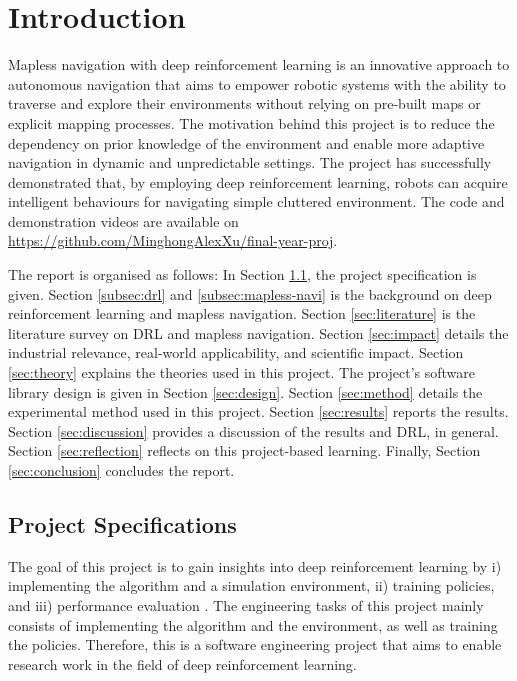 \newpage
\section{Introduction}

Mapless navigation with deep reinforcement learning is an innovative approach to autonomous navigation that aims to empower robotic systems with the ability to traverse and explore their environments without relying on pre-built maps or explicit mapping processes. The motivation behind this project is to reduce the dependency on prior knowledge of the environment and enable more adaptive navigation in dynamic and unpredictable settings. The project has successfully demonstrated that, by employing deep reinforcement learning, robots can acquire intelligent behaviours for navigating simple cluttered environment. The code and demonstration videos are available on \url{https://github.com/MinghongAlexXu/final-year-proj}.

The report is organised as follows: 
In Section \ref{subsec:spec}, the project specification is given.
Section \ref{subsec:drl} and \ref{subsec:mapless-navi} is the background on deep reinforcement learning and mapless navigation.
Section \ref{sec:literature} is the literature survey on DRL and mapless navigation.
Section \ref{sec:impact} details the industrial relevance, real-world applicability, and scientific impact.
Section \ref{sec:theory} explains the theories used in this project.
The project's software library design is given in Section \ref{sec:design}.
Section \ref{sec:method} details the experimental method used in this project.
Section \ref{sec:results} reports the results.
Section \ref{sec:discussion} provides a discussion of the results and DRL, in general.
Section \ref{sec:reflection} reflects on this project-based learning.
Finally, Section \ref{sec:conclusion} concludes the report.



\subsection{Project Specifications} \label{subsec:spec}

The goal of this project is to gain insights into deep reinforcement learning by i) implementing the algorithm and a simulation environment, ii) training policies, and iii) performance evaluation \cite{ref:spec-report}. The engineering tasks of this project mainly consists of implementing the algorithm and the environment, as well as training the policies. Therefore, this is a software engineering project that aims to enable research work in the field of deep reinforcement learning.

